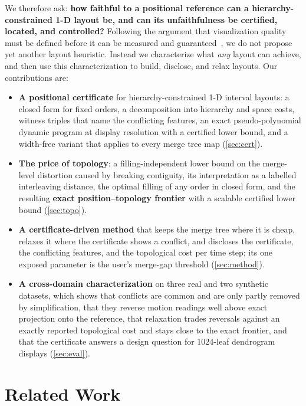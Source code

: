 \documentclass[review]{vgtc}                 %
\begin{document}
We therefore ask: \textbf{how faithful to a positional reference can a hierarchy-constrained 1-D layout be, and can its unfaithfulness be certified, located, and controlled?} Following the argument that visualization quality must be defined before it can be measured and guaranteed~\cite{Meulemans:2026:AP}, we do not propose yet another layout heuristic. Instead we characterize what \emph{any} layout can achieve, and then use this characterization to build, disclose, and relax layouts. Our contributions are:
\begin{itemize}
\item \textbf{A positional certificate} for hierarchy-constrained 1-D interval layouts: a closed form for fixed orders, a decomposition into hierarchy and space costs, witness triples that name the conflicting features, an exact pseudo-polynomial dynamic program at display resolution with a certified lower bound, and a width-free variant that applies to every merge tree map (\cref{sec:cert}).
\item \textbf{The price of topology}: a filling-independent lower bound on the merge-level distortion caused by breaking contiguity, its interpretation as a labelled interleaving distance, the optimal filling of any order in closed form, and the resulting \textbf{exact position--topology frontier} with a scalable certified lower bound (\cref{sec:topo}).
\item \textbf{A certificate-driven method} that keeps the merge tree where it is cheap, relaxes it where the certificate shows a conflict, and discloses the certificate, the conflicting features, and the topological cost per time step; its one exposed parameter is the user's merge-gap threshold (\cref{sec:method}).
\item \textbf{A cross-domain characterization} on three real and two synthetic datasets, which shows that conflicts are common and are only partly removed by simplification, that they reverse motion readings well above exact projection onto the reference, that relaxation trades reversals against an exactly reported topological cost and stays close to the exact frontier, and that the certificate answers a design question for 1024-leaf dendrogram displays (\cref{sec:eval}).
\end{itemize}

\section{Related Work}
\end{document}
